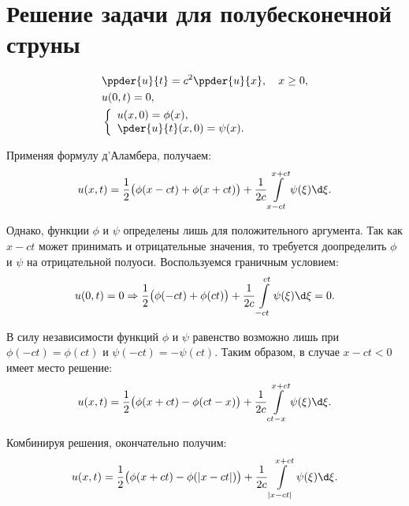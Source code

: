 \section{Решение задачи для полубесконечной струны}
\begin{align*}
    & \ppder{u}{t} = c^2\ppder{u}{x}, \quad x \ge 0, \\
    & u(0, t) = 0, \\
    & \left\{ \begin{array}{l}
        u(x, 0) = \phi(x), \\
        \ds \pder{u}{t}(x, 0) = \psi(x).
    \end{array} \right.
\end{align*}

Применяя формулу д'Аламбера, получаем:
\[
    u(x, t) = \frac{1}{2}\bigl(\phi(x - ct) + \phi(x + ct)\bigr) +
    \frac{1}{2c}\int\limits_{x - ct}^{x + ct} \psi(\xi)\d\xi.
\]

Однако, функции \( \phi \) и \( \psi \) определены лишь для положительного
аргумента. Так как \( x - ct \) может принимать и отрицательные значения, то
требуется доопределить \( \phi \) и \( \psi \) на отрицательной полуоси.
Воспользуемся граничным условием:
\[
    u(0, t) = 0 \Rightarrow \frac{1}{2}\bigl(\phi(-ct) + \phi(ct)\bigr) +
    \frac{1}{2c}\int\limits_{-ct}^{ct} \psi(\xi)\d\xi = 0.
\]

В силу независимости функций \( \phi \) и \( \psi \) равенство возможно лишь при
\( \phi(-ct) = \phi(ct) \) и \( \psi(-ct) = -\psi(ct) \). Таким образом, в
случае \( x - ct < 0 \) имеет место решение:
\[
    u(x, t) = \frac{1}{2}\bigl(\phi(x + ct) - \phi(ct - x)\bigr) +
    \frac{1}{2c}\int\limits_{ct - x}^{x + ct} \psi(\xi)\d\xi.
\]

Комбинируя решения, окончательно получим:
\[
    u(x, t) = \frac{1}{2}\bigl(\phi(x + ct) - \phi(|x - ct|)\bigr) +
    \frac{1}{2c}\int\limits_{|x - ct|}^{x + ct} \psi(\xi)\d\xi.
\]
\newpage
